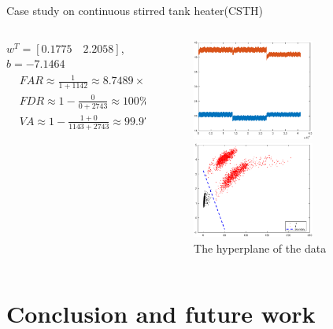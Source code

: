 \documentclass[10pt]{beamer}
\begin{document}
\begin{frame}{Case study on continuous stirred tank heater(CSTH)}
     \begin{columns}
             \begin{column}{0.5\textwidth}
 $w^T = [0.1775 \quad 2.2058]$,$b = -7.1464$
\begin{equation} \nonumber
  \begin{aligned}
   & FAR \approx \frac{1}{1+1142} \approx  8.7489\times 10^{-2} \% \\
   & FDR \approx 1 - \frac{0}{0+2743} \approx 100 \% \\
   & VA \approx 1 - \frac{1+0}{1143+2743} \approx 99.97 \% 
  \end{aligned}
\end{equation}
           \end{column}
        \begin{column}{0.5\textwidth}  %
   \begin{figure}
        \centering
        \includegraphics[width=4cm]{fig/csthrealdata.eps}
        \caption{real data from CSTH}
        \includegraphics[width=4cm]{fig/Csthboundary.eps}
        \caption{The hyperplane of the data}
        \end{figure}
  
        \end{column}
    \end{columns}
\end{frame}
\section{Conclusion and future work}
\end{document}
